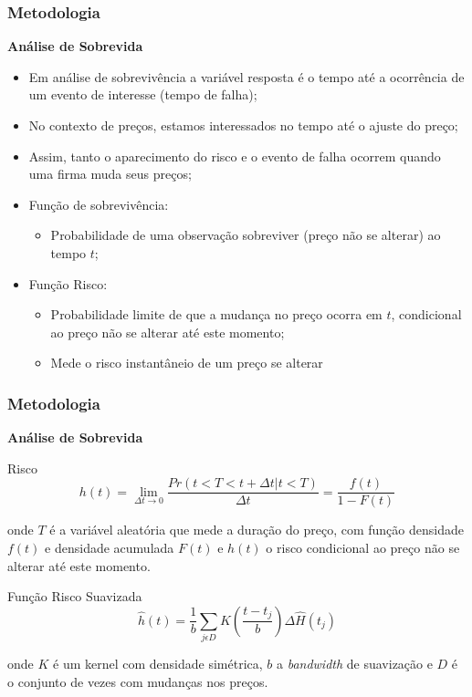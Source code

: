 \documentclass[aspectratio=169]{beamer}
\begin{document}
\begin{frame}\frametitle{Metodologia}
  \textbf{Análise de Sobrevida}
  \begin{itemize}
  \item Em análise de sobrevivência a variável resposta é o tempo até a ocorrência de um evento de interesse (tempo de falha);
  \item No contexto de preços, estamos interessados no tempo até o ajuste do preço;
  \item Assim, tanto o aparecimento do risco e o evento de falha ocorrem quando uma firma muda seus preços;
  \item Função de sobrevivência:
    \begin{itemize}
    \item Probabilidade de uma observação sobreviver (preço não se alterar) ao tempo $t$;
    \end{itemize}
  \item Função Risco:
  \begin{itemize}
    \item Probabilidade limite de que a mudança no preço ocorra em $t$, condicional ao preço não se alterar até este momento;
    \item Mede o risco instantâneio de um preço se alterar
    \end{itemize}
  \end{itemize}
\end{frame}

\begin{frame}\frametitle{Metodologia}
  \textbf{Análise de Sobrevida}
  \begin{exampleblock}{Risco}
  \[
  h(t)=\lim_{\Delta t\rightarrow 0}{\frac{Pr(t<T<t+\Delta t|t<T)}{\Delta t}=\frac{f(t)}{1-F(t)}} 
  \]
  \end{exampleblock}
onde $T$ é a variável aleatória que mede a duração do preço, com função densidade $f(t)$ e densidade acumulada $F(t)$ e $h(t)$ o risco condicional ao preço não se alterar até este momento. 
  \begin{exampleblock}{Função Risco Suavizada}
  \[
\hat{h}\left(t \right)=\frac{1}{b}\sum_{j\epsilon D}{K}\left(\frac{t-{t}_{j}}{b}\right)\Delta \hat {H}\left({t}_{j}\right) 
  \]
  \end{exampleblock}
onde $K$ é um kernel com densidade simétrica, $b$ a \emph{bandwidth} de suavização e $D$ é o conjunto de vezes com mudanças nos preços.
\end{frame}
\end{document}

